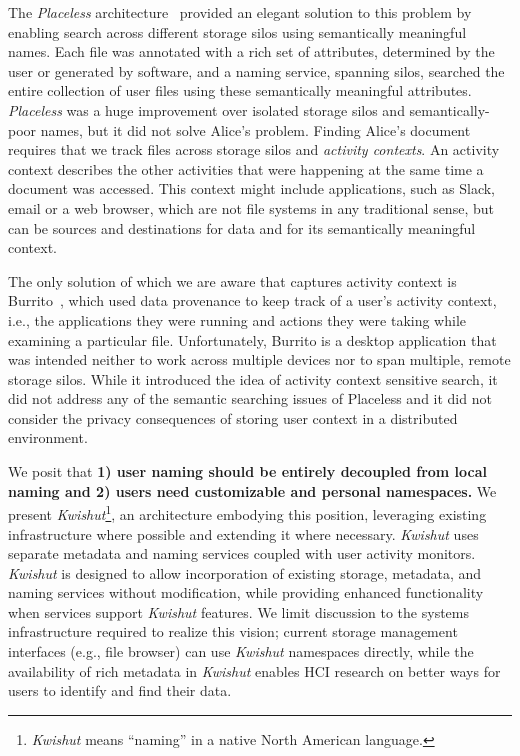 The \emph{Placeless} architecture~\cite{placeless-tois} provided an elegant
solution to this problem by enabling search across different storage silos using
semantically meaningful names. Each file was annotated with a rich set of
attributes, determined by the user or generated by software, and a naming
service, spanning silos, searched the entire collection of user files using
these semantically meaningful attributes. \emph{Placeless} was a huge
improvement over isolated storage silos and semantically-poor names, but it did
not solve Alice’s problem. Finding Alice's document requires that we track files
across storage silos and \emph{activity contexts}. An activity context describes
the other activities that were happening at the same time a document was
accessed. This context might include applications, such as Slack, email or a web
browser, which are not file systems in any traditional sense, but can be sources
and destinations for data and for its semantically meaningful context.

The only solution of which we are aware that captures activity context is
Burrito~\cite{guo2012burrito}, which used data provenance to keep track of a
user’s activity context, i.e., the applications they were running and actions
they were taking while examining a particular file. Unfortunately, Burrito is a
desktop application that was intended neither to work across multiple devices
nor to span multiple, remote storage silos. While it introduced the idea of
activity context sensitive search, it did not address any of the semantic
searching issues of Placeless and it did not consider the privacy consequences
of storing user context in a distributed environment.

We posit that \textbf{1) user naming should be entirely decoupled from local naming and 2) users need customizable and personal namespaces.}
We present \emph{Kwishut}\footnote{\emph{Kwishut} means ``naming'' in a native North American language.}, an architecture embodying this position, leveraging existing infrastructure where possible and extending it where necessary.
\emph{Kwishut} uses separate metadata and naming services coupled with user activity monitors.
\emph{Kwishut} is designed to allow incorporation of existing storage, metadata, and naming services without modification, while providing enhanced functionality when services support \emph{Kwishut} features.
We limit discussion to the systems infrastructure required to realize this vision; current storage management interfaces (e.g., file browser) can use \emph{Kwishut} namespaces directly, while the availability of rich metadata in \emph{Kwishut} enables HCI research on better ways for users to identify and find their data.

